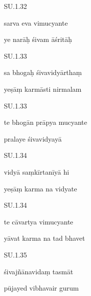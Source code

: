 \documentclass{article}
\begin{document}

    
	
	    
		SU.1.32 
    
	    
		sarva eva vimucyante 
    
	    
		ye narāḥ śivam āśritāḥ 
    

    
	
	    
		SU.1.33 
    
	    
		sa bhogaḥ śivavidyārthaṃ 
    
	    
		yeṣāṃ karmāsti nirmalam 
    

    
	
	    
		SU.1.33 
    
	    
		te bhogān prāpya mucyante 
    
	    
		pralaye śivavidyayā 
    

    
	
	    
		SU.1.34 
    
	    
		vidyā saṃkīrtanīyā hi 
    
	    
		yeṣāṃ karma na vidyate 
    

    
	
	    
		SU.1.34 
    
	    
		te cāvartya vimucyante 
    
	    
		yāvat karma na tad bhavet 
    

    
	
	    
		SU.1.35 
    
	    
		śivajñānavidaṃ tasmāt 
    
	    
		pūjayed vibhavair gurum 
    

    
	
\end{document}
